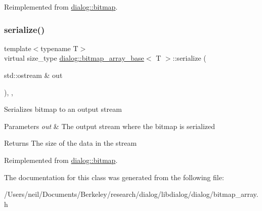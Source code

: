 Reimplemented from \hyperlink{classdialog_1_1bitmap_a5c4c9a790b785bbc021d913a53cffe80}{dialog\+::bitmap}.

\mbox{\label{classdialog_1_1bitmap__array__base_aa7a0aa644a5a37eaf87a902a20cee939}} 
\subsubsection{\texorpdfstring{serialize()}{serialize()}}
{\footnotesize\ttfamily template$<$typename T$>$ \\
virtual size\+\_\+type \hyperlink{classdialog_1_1bitmap__array__base}{dialog\+::bitmap\+\_\+array\+\_\+base}$<$ T $>$\+::serialize (\begin{DoxyParamCaption}\item[{std\+::ostream \&}]{out }\end{DoxyParamCaption})\hspace{0.3cm}{\ttfamily [inline]}, {\ttfamily [override]}, {\ttfamily [virtual]}}

Serializes bitmap to an output stream 
\begin{DoxyParams}{Parameters}
{\em out} & The output stream where the bitmap is serialized \\
\hline
\end{DoxyParams}
\begin{DoxyReturn}{Returns}
The size of the data in the stream 
\end{DoxyReturn}


Reimplemented from \hyperlink{classdialog_1_1bitmap_af93ff2660d3b790eee85692a41bdb823}{dialog\+::bitmap}.



The documentation for this class was generated from the following file\+:\begin{DoxyCompactItemize}
\item 
/\+Users/neil/\+Documents/\+Berkeley/research/dialog/libdialog/dialog/bitmap\+\_\+array.\+h\end{DoxyCompactItemize}
